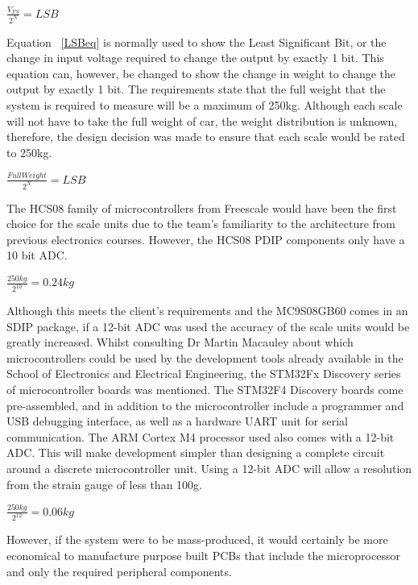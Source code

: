 \centerline{\(\frac{V_{FS}}{2^{N}} = LSB  \) \cite{edp2}}
\label{LSBeq}

Equation ~\ref{LSBeq} is normally used to show the Least Significant Bit, or the change in input voltage required to change the output by exactly 1 bit. This equation can, however, be changed to show the change in weight to change the output by exactly 1 bit.
The requirements state that the full weight that the system is required to measure will be a maximum of 250kg. Although each scale will not have to take the full weight of car, the weight distribution is unknown, therefore, the design decision was made to ensure that each scale would be rated to 250kg.  \\

\centerline{$\frac{Full Weight}{2^{N}} = LSB$}  \label{LSBeq2}

The HCS08 family of microcontrollers from Freescale would have been the first choice for the scale units due to the team's familiarity to the architecture from previous electronics courses. However, the HCS08 \cite{HCS08} PDIP components only have a 10 bit ADC.\\

\centerline{$\frac{250kg}{2^{10}} = 0.24kg$} \label{LSBeq3}

Although this meets the client's requirements and the MC9S08GB60 \cite{MC9S08GB60} comes in an SDIP package, if a 12-bit ADC was used the accuracy of the scale units would be greatly increased. Whilst consulting Dr Martin Macauley about which microcontrollers could be used by the development tools already available in the School of Electronics and Electrical Engineering, the STM32Fx Discovery series of microcontroller boards was mentioned. The STM32F4 Discovery \cite{STM32F4} boards come pre-assembled, and in addition to the microcontroller include a programmer and USB debugging interface, as well as a hardware UART unit for serial communication. The ARM Cortex M4 processor used also comes with a 12-bit ADC. This will make development simpler than designing a complete circuit around a discrete microcontroller unit.  Using a 12-bit ADC will allow a resolution from the strain gauge of less than 100g. 
\\

\centerline{$\frac{250kg}{2^{12}} = 0.06kg$}

However, if the system were to be mass-produced, it would certainly be more economical to manufacture purpose built PCBs that include the microprocessor and only the required peripheral components. 
